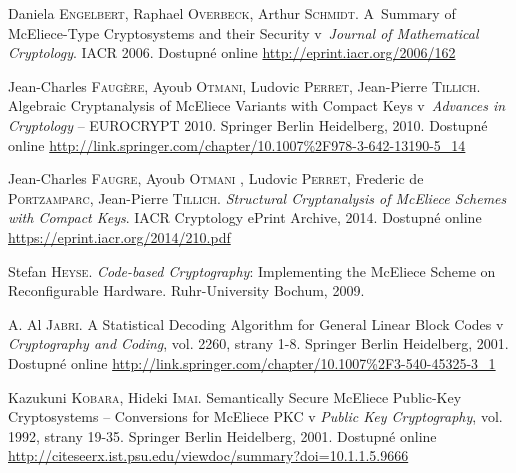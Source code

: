 \documentclass[thesis=M,czech,hidelinks]{FITthesis}[2012/06/26]
\newcommand{\0}{{\textcolor[gray]{0.80}{0}}}
\begin{document}
\begin{thebibliography}{99}
        Daniela \textsc{Engelbert}, Raphael \textsc{Overbeck}, Arthur
        \textsc{Schmidt}. A~Summary of McEliece-Type Cryptosystems and their
        Security v~\emph{Journal of Mathematical Cryptology}. IACR 2006.
        Dostupné online \url{http://eprint.iacr.org/2006/162}

        Jean-Charles \textsc{Faugère}, Ayoub \textsc{Otmani}, Ludovic
        \textsc{Perret}, Jean-Pierre \textsc{Tillich}. Algebraic Cryptanalysis
        of McEliece Variants with Compact Keys v~\emph{Advances in Cryptology}
        -- EUROCRYPT 2010. Springer Berlin Heidelberg, 2010. Dostupné online
        \url{http://link.springer.com/chapter/10.1007\%2F978-3-642-13190-5\_14}

        Jean-Charles \textsc{Faugre}, Ayoub \textsc{Otmani} , Ludovic
        \textsc{Perret}, Frederic de \textsc{Portzamparc}, Jean-Pierre
        \textsc{Tillich}. \emph{Structural Cryptanalysis of McEliece Schemes
        with Compact Keys}. IACR Cryptology ePrint Archive, 2014. Dostupné
        online \url{https://eprint.iacr.org/2014/210.pdf}

%

        Stefan \textsc{Heyse}. \emph{Code-based Cryptography}: Implementing the
        McEliece Scheme on Reconfigurable Hardware. Ruhr-University Bochum,
        2009.

        A. Al \textsc{Jabri}. A Statistical Decoding Algorithm for General
        Linear Block Codes v \emph{Cryptography and Coding}, vol. 2260, strany
        1-8. Springer Berlin Heidelberg, 2001. Dostupné online
        \url{http://link.springer.com/chapter/10.1007\%2F3-540-45325-3\_1}

        Kazukuni \textsc{Kobara}, Hideki \textsc{Imai}. Semantically Secure
        McEliece Public-Key Cryptosystems -- Conversions for McEliece PKC v
        \emph{Public Key Cryptography}, vol. 1992, strany 19-35. Springer Berlin
        Heidelberg, 2001. Dostupné online
        \url{http://citeseerx.ist.psu.edu/viewdoc/summary?doi=10.1.1.5.9666}


\end{thebibliography}
\end{document}
